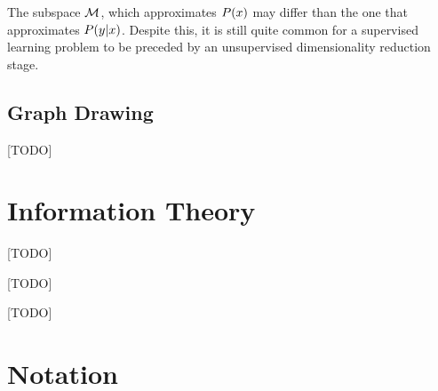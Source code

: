 \begin{remark}
The subspace $\mathcal{M}$, which approximates $P(x)$ may differ than the one that approximates $P(y|x)$. Despite this, it is still quite common for a supervised learning problem to be preceded by an unsupervised dimensionality reduction stage.
\end{remark}


\section{Graph Drawing}
[TODO]






\chapter{Information Theory}
\label{apx:information_theory}


\begin{definition}[Entropy]
\label{def:entropy}
[TODO]
\end{definition}



\begin{definition}
\label{def:mutual_information}
[TODO]
\end{definition}



\begin{definition}
\label{def:kl_divergence}
[TODO]
\end{definition}







\chapter{Notation}
\label{apx:notation}

